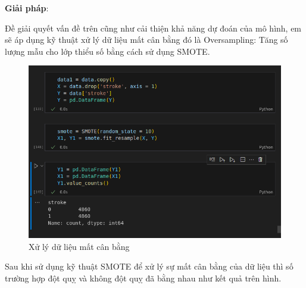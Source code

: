 \documentclass[11pt]{article}
\begin{document}
	\textbf{Giải pháp}:
	\begin{flushleft}
		Đề giải quyết vấn đề trên cũng như cải thiện khả năng dự đoán của mô hình, em sẽ áp dụng kỹ thuật xử lý dữ liệu mất cân bằng đó là Oversampling: Tăng số lượng mẫu cho lớp thiểu số bằng cách sử dụng SMOTE.
		
		\begin{figure}[H]
			\centering
			\includegraphics[width=0.7\linewidth]{solBalanceData}
			\caption{Xử lý dữ liệu mất cân bằng}
			\label{fig:solbalancedata}
		\end{figure}
		
		Sau khi sử dụng kỹ thuật SMOTE để xử lý sự mất cân bằng của dữ liệu thì số trường hợp đột quỵ và không đột quỵ đã bằng nhau như kết quả trên hình.
	\end{flushleft}
	
	
	
	
\end{document}
